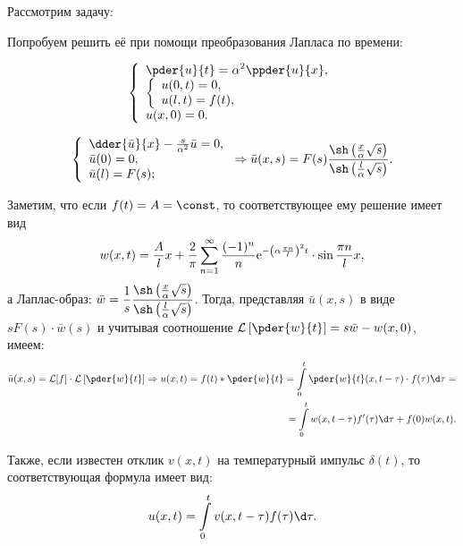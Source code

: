 
\begin{minipage}{.55\textwidth}
    Рассмотрим задачу:

    Попробуем решить её при помощи преобразования Лапласа по времени:
\end{minipage}
\hfill
\begin{minipage}{.4\textwidth}
    \[
        \left\{ \begin{array}{l}
            \ds \pder{u}{t} = \alpha^2 \ppder{u}{x}, \\
                \left\{ \begin{array}{l}
                    u(0, t) = 0, \\
                    u(l, t) = f(t),
                \end{array} \right. \\
            u(x, 0) = 0.
        \end{array} \right.
    \]
\end{minipage}

\[
    \left\{ \begin{array}{l}
        \dder{\bar{u}}{x} - \frac{s}{\alpha^2}\bar{u} = 0, \\
        \bar{u}(0) = 0, \\
        \bar{u}(l) = F(s);
    \end{array} \right.
    \Rightarrow
    \bar{u}(x, s) = F(s)\frac{\sh\left(\frac{x}{\alpha}\sqrt{s}\right)}
    {\sh\left(\frac{l}{\alpha}\sqrt{s}\right)}.
\]

Заметим, что если \( f(t) = A = \const \), то соответствующее ему решение имеет
вид
\[
    w(x, t) = \frac{A}{l}x + \frac{2}{\pi}\sum\limits_{n=1}^\infty
    \frac{(-1)^n}{n}\mathrm{e}^{-\left(\alpha\frac{\pi n}{l}\right)^2t}\cdot
    \sin\frac{\pi n}{l}x,
\]
а Лаплас-образ: \( \ds \bar{w} = \frac{1}{s}\frac{\sh\left(
\frac{x}{\alpha}\sqrt{s}\right)}{\sh\left(\frac{l}{\alpha}\sqrt{s}\right)} \).
Тогда, представляя \( \bar{u}(x, s) \) в виде \( sF(s)\cdot\bar{w}(s) \) и
учитывая соотношение
\( \ds \mathcal{L}\left[\pder{w}{t}\right] = s\bar{w} - w(x, 0) \), имеем:
\begin{align*}
    \bar{u}(x, s) = \mathcal{L}[f]\cdot \mathcal{L}\left[\pder{w}{t}\right]
    \Rightarrow u(x, t) = f(t)*\pder{w}{t} =
    \int\limits_0^t \pder{w}{t}(x, t-\tau)\cdot f(\tau)\d\tau = \\
    = \int\limits_0^t w(x, t - \tau)f'(\tau)\d\tau + f(0)w(x, t).
\end{align*}

Также, если известен отклик \( v(x, t) \) на температурный импульс
\( \delta(t) \), то соответствующая формула имеет вид:
\[
    u(x, t) = \int\limits_0^t v(x, t - \tau)f(\tau)\d\tau.
\]

\newpage
